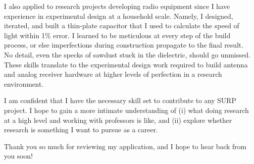 \documentclass[12pt]{article}
\begin{document}
I also applied to research projects developing radio equipment since I have experience in experimental design at a household scale. Namely, I designed, iterated, and built a thin-plate capacitor that I used to calculate the speed of light within 1\% error. I learned to be meticulous at every step of the build process, or else imperfections during construction propagate to the final result. No detail, even the specks of sawdust stuck in the dielectric, should go unmissed. These skills translate to the experimental design work required to build antenna and analog receiver hardware at higher levels of perfection in a research environment.

I am confident that I have the necessary skill set to contribute to any SURP project. I hope to gain a more intimate understanding of (i) what doing research at a high level and working with professors is like, and (ii) explore whether research is something I want to pursue as a career.

Thank you so much for reviewing my application, and I hope to hear back from you soon!
\end{document}
